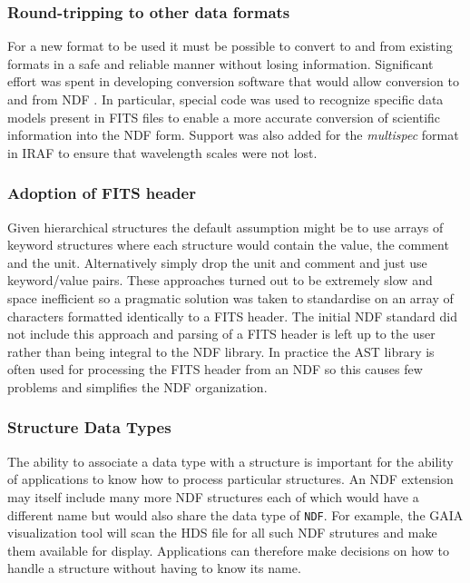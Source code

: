 \documentclass[final,authoryear,5p,times,twocolumn]{elsarticle}
\begin{document}
{\subsubsection{Round-tripping to other data formats}

For a new format to be used it must be possible to
convert to and from existing formats in a safe and reliable manner
without losing information.
Significant effort was spent in developing conversion software that
would allow conversion to and from NDF
\citep{SUN55,1997STARB..19...14C}. In particular, special code was
used to recognize specific data models present in FITS files to enable
a more accurate conversion of scientific information into the NDF
form. Support was also added for the \emph{multispec} format in IRAF
\citep{1993ASPC...52..467V} to ensure that wavelength scales were not
lost.

\subsubsection{Adoption of FITS header}

Given hierarchical structures the default assumption might be to use
arrays of keyword structures where each structure would contain the
value, the comment and the unit. Alternatively simply drop the unit
and comment and just use keyword/value pairs. These approaches turned
out to be extremely slow and space inefficient so a pragmatic solution
was taken to standardise on an array of characters formatted
identically to a FITS header. The initial NDF standard did not include
this approach and parsing of a FITS header is left up to the user
rather than being integral to the NDF library. In practice the AST
library \citep{1998ASPC..145...41W} is often used for processing the FITS
header from an NDF so this causes few problems and simplifies the NDF
organization.

\subsubsection{Structure Data Types}

The ability to associate a data type with a structure is important for
the ability of applications to know how to process particular
structures. An NDF extension may itself include many more NDF
structures each of which would have a different name but would also
share the data type of \texttt{NDF}. For example, the GAIA
visualization tool \citep{2009ASPC..411..575D} will scan the HDS file
for all such NDF strutures and make them available for
display. Applications can therefore make decisions on how to handle a
structure without having to know its name.

}
\end{document}
